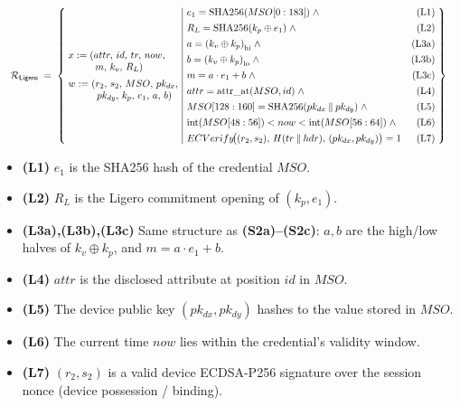 \documentclass[binding=0.6cm,oneside,noexaminfo]{sapthesis}
\newcommand{\concat}{\mathbin{\|}}
\newcommand{\hipart}[1]{{#1}_{\mathrm{hi}}}
\newcommand{\lopart}[1]{{#1}_{\mathrm{lo}}}
\newcommand{\intcast}{\mathrm{int}}
\newcommand{\SHA}{\mathrm{SHA256}}
\newcommand{\attrat}{\mathrm{attr\_at}}
\newcommand{\Rel}[1]{\mathcal{R}_{#1}}
\newcommand{\RelLigero}{\Rel{\mathsf{Ligero}}}
\begin{document}
\begin{mdframed}[style=relationbox]
\[
\resizebox{\linewidth}{!}{$\displaystyle
\RelLigero \;=\; \left\{\;
\begin{array}{@{}l@{}}
x := (attr,\, id,\, tr,\, now, \\
\phantom{x := (}\, m,\, k_v,\, R_L) \\[5pt]
w := (r_2,\, s_2,\, MSO,\, pk_{dx}, \\
\phantom{w := (}\, pk_{dy},\, k_p,\, e_1,\, a,\, b)
\end{array}
\;\middle|\;
\begin{array}{@{}l@{\quad}r@{}}
e_1 = \SHA(MSO[0:183]) \;\wedge & \text{(L1)} \\[4pt]
R_L = \SHA(k_p \oplus e_1) \;\wedge & \text{(L2)} \\[4pt]
a = \hipart{(k_v \oplus k_p)} \;\wedge & \text{(L3a)} \\[4pt]
b = \lopart{(k_v \oplus k_p)} \;\wedge & \text{(L3b)} \\[4pt]
m = a \cdot e_1 + b \;\wedge & \text{(L3c)} \\[4pt]
attr = \attrat(MSO, id) \;\wedge & \text{(L4)} \\[4pt]
MSO[128:160] = \SHA(pk_{dx} \concat pk_{dy}) \;\wedge & \text{(L5)} \\[4pt]
\intcast(MSO[48:56]) < now < \intcast(MSO[56:64]) \;\wedge & \text{(L6)} \\[4pt]
ECVerify\!\bigl((r_2,s_2),\, H(tr \concat hdr),\, (pk_{dx},pk_{dy})\bigr) = 1 & \text{(L7)}
\end{array}
\;\right\}
$}
\]
\end{mdframed}

\begin{itemize}[leftmargin=2em, itemsep=2pt]
  \item \textbf{(L1)} $e_1$ is the SHA256 hash of the credential $MSO$.
  \item \textbf{(L2)} $R_L$ is the Ligero commitment opening of $(k_p, e_1)$.
  \item \textbf{(L3a),(L3b),(L3c)} Same structure as \textbf{(S2a)--(S2c)}:
        $a, b$ are the high/low halves of $k_v \oplus k_p$, and
        $m = a \cdot e_1 + b$.
  \item \textbf{(L4)} $attr$ is the disclosed attribute at position $id$ in $MSO$.
  \item \textbf{(L5)} The device public key $(pk_{dx}, pk_{dy})$ hashes to the
        value stored in $MSO$.
  \item \textbf{(L6)} The current time $now$ lies within the credential's
        validity window.
  \item \textbf{(L7)} $(r_2, s_2)$ is a valid device ECDSA-P256 signature
        over the session nonce (device possession / binding).
\end{itemize}
\end{document}
